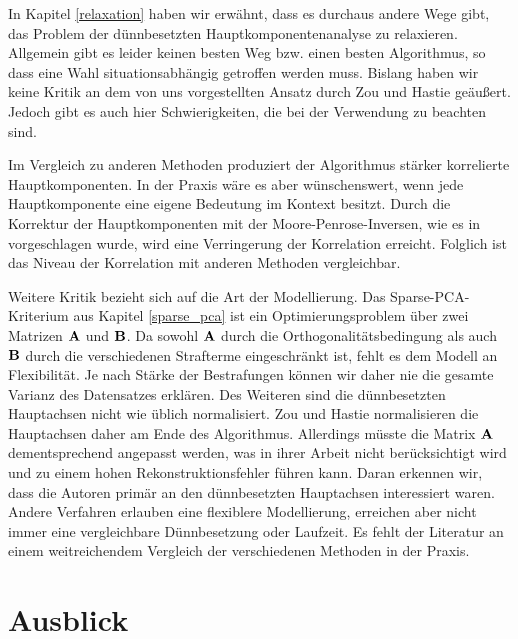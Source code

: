 In Kapitel \ref{relaxation} haben wir erwähnt, dass es durchaus andere Wege gibt, das Problem der dünnbesetzten Hauptkomponentenanalyse zu relaxieren. Allgemein gibt es leider keinen besten Weg bzw. einen besten Algorithmus, so dass eine Wahl situationsabhängig getroffen werden muss. Bislang haben wir keine Kritik an dem von uns vorgestellten Ansatz durch Zou und Hastie \cite{zou_sparsepca} geäußert. Jedoch gibt es auch hier Schwierigkeiten, die bei der Verwendung zu beachten sind. 

Im Vergleich zu anderen Methoden produziert der Algorithmus stärker korrelierte Hauptkomponenten. In der Praxis wäre es aber wünschenswert, wenn jede Hauptkomponente eine eigene Bedeutung im Kontext besitzt. Durch die Korrektur der Hauptkomponenten mit der Moore-Penrose-Inversen, wie es in \cite{camacho} vorgeschlagen wurde, wird eine Verringerung der Korrelation erreicht. Folglich ist das Niveau der Korrelation mit anderen Methoden vergleichbar. 

Weitere Kritik bezieht sich auf die Art der Modellierung. Das Sparse-PCA-Kriterium aus Kapitel \ref{sparse_pca} ist ein Optimierungsproblem über zwei Matrizen $\mathbf{A}$ und $\mathbf{B}$. Da sowohl $\mathbf{A}$ durch die Orthogonalitätsbedingung als auch $\mathbf{B}$ durch die verschiedenen Strafterme eingeschränkt ist, fehlt es dem Modell an Flexibilität. Je nach Stärke der Bestrafungen können wir daher nie die gesamte Varianz des Datensatzes erklären. Des Weiteren sind die dünnbesetzten Hauptachsen nicht wie üblich normalisiert. Zou und Hastie normalisieren die Hauptachsen daher am Ende des Algorithmus. Allerdings müsste die Matrix $\mathbf{A}$ dementsprechend angepasst werden, was in ihrer Arbeit nicht berücksichtigt wird und zu einem hohen Rekonstruktionsfehler führen kann. Daran erkennen wir, dass die Autoren primär an den dünnbesetzten Hauptachsen interessiert waren. Andere Verfahren erlauben eine flexiblere Modellierung, erreichen aber nicht immer eine vergleichbare Dünnbesetzung oder Laufzeit. Es fehlt der Literatur an einem weitreichendem Vergleich der verschiedenen Methoden in der Praxis.




\section{Ausblick}

